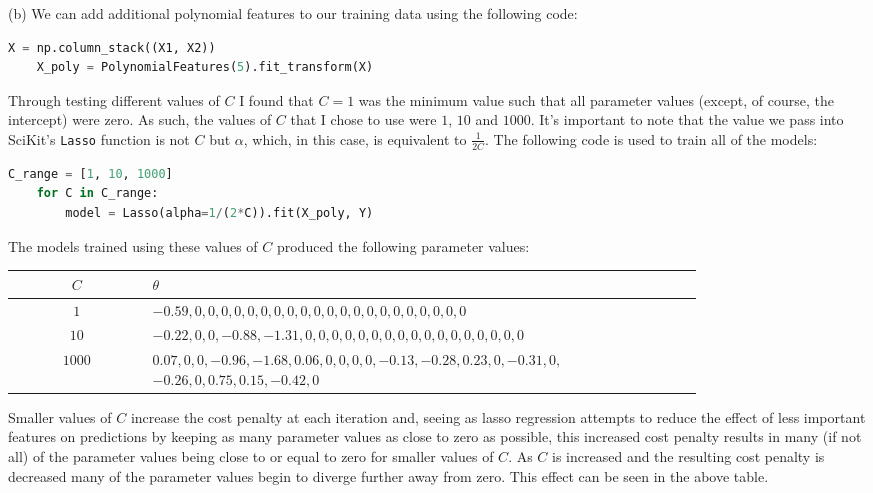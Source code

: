 \documentclass[12pt]{article}
\begin{document}
\noindent (b) We can add additional polynomial features to our training data using the following code:

\begin{center}
    \lstset{basicstyle=\footnotesize}
    \begin{lstlisting}[language=Python]
    X = np.column_stack((X1, X2))
    X_poly = PolynomialFeatures(5).fit_transform(X)
    \end{lstlisting}
\end{center}

Through testing different values of $C$ I found that $C = 1$ was the minimum value such that all parameter values (except, of course, the intercept) were zero. As such, the values of $C$ that I chose to use were $1$, $10$ and $1000$. It's important to note that the value we pass into SciKit's \texttt{Lasso} function is not $C$ but $\alpha$, which, in this case, is equivalent to $\frac{1}{2C}$. The following code is used to train all of the models:

\begin{center}
    \lstset{basicstyle=\footnotesize}
    \begin{lstlisting}[language=Python]
    C_range = [1, 10, 1000]
    for C in C_range:
        model = Lasso(alpha=1/(2*C)).fit(X_poly, Y)
    \end{lstlisting}
\end{center}

The models trained using these values of $C$ produced the following parameter values:

\begin{center}
    \begin{tabular}{|c|p{0.8\linewidth}|}
        \hline
        $C$ & $\theta$ \\
        \hline
        $1$ & $-0.59, 0, 0, 0, 0, 0, 0, 0, 0, 0, 0, 0, 0, 0, 0, 0, 0, 0, 0, 0, 0, 0$ \\
        \hline
        $10$ & $-0.22, 0, 0, -0.88, -1.31, 0, 0, 0, 0, 0, 0, 0, 0, 0, 0, 0, 0, 0, 0, 0, 0, 0$ \\
        \hline
        $1000$ & $0.07, 0, 0, -0.96, -1.68, 0.06, 0, 0, 0, 0, -0.13, -0.28, 0.23, 0, -0.31, 0,$ $-0.26, 0, 0.75, 0.15, -0.42, 0$ \\
        \hline
    \end{tabular}
\end{center}

Smaller values of $C$ increase the cost penalty at each iteration and, seeing as lasso regression attempts to reduce the effect of less important features on predictions by keeping as many parameter values as close to zero as possible, this increased cost penalty results in many (if not all) of the parameter values being close to or equal to zero for smaller values of $C$. As $C$ is increased and the resulting cost penalty is decreased many of the parameter values begin to diverge further away from zero. This effect can be seen in the above table.
\end{document}
